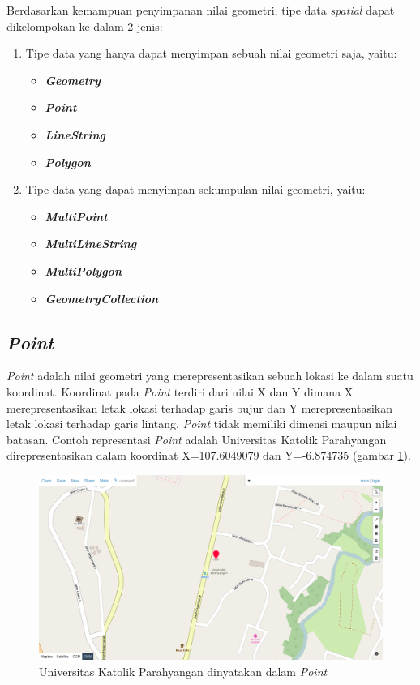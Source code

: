 	Berdasarkan kemampuan penyimpanan nilai geometri, tipe data \textit{spatial} dapat dikelompokan ke dalam 2 jenis:
\begin{enumerate}
	\item Tipe data yang hanya dapat menyimpan sebuah nilai geometri saja, yaitu:
	\begin{itemize}
		\item \textbf{\textit{Geometry}}
		\item \textbf{\textit{Point}}
		\item \textbf{\textit{LineString}}
		\item \textbf{\textit{Polygon}}
	\end{itemize}
	\item Tipe data yang dapat menyimpan sekumpulan nilai geometri, yaitu:
	\begin{itemize}
		\item \textbf{\textit{MultiPoint}}
		\item \textbf{\textit{MultiLineString}}
		\item \textbf{\textit{MultiPolygon}}
		\item \textbf{\textit{GeometryCollection}}
	\end{itemize}
\end{enumerate}

\subsection{\textit{Point}}
\label{sec:point}
\textit{Point} adalah nilai geometri yang merepresentasikan sebuah lokasi ke dalam suatu koordinat\cite{mysqlspatial}. Koordinat pada \textit{Point} terdiri dari nilai X dan Y dimana X merepresentasikan letak lokasi terhadap garis bujur dan Y merepresentasikan letak lokasi terhadap garis lintang. \textit{Point} tidak memiliki dimensi maupun nilai batasan. Contoh representasi \textit{Point} adalah Universitas Katolik Parahyangan direpresentasikan dalam koordinat X=107.6049079 dan Y=-6.874735 (gambar \ref{fig:2_UNPAR}).

\begin{figure}[htbp]
	\centering
		\includegraphics[scale=0.35]{Gambar/2_point.png}
	\caption{Universitas Katolik Parahyangan dinyatakan dalam \textit{Point}\cite{geojson}}
	\label{fig:2_UNPAR}
\end{figure}

